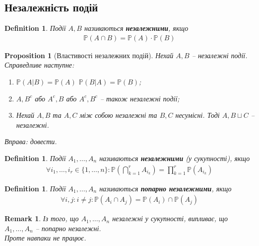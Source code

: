 \documentclass[a4paper, 10pt]{article}
\theoremstyle{theoremdd}
\newtheorem{definition}[theorem]{Definition}
\newtheorem{proposition}[theorem]{Proposition}
\newtheorem{remark}[theorem]{Remark}
\begin{document}
\subsection{Незалежність подій}
\begin{definition}
Події $A,B$ називаються \textbf{незалежними}, якщо
\begin{align*}
\mathbb{P}(A \cap B) = \mathbb{P}(A) \cdot \mathbb{P}(B)
\end{align*}
\end{definition}

\begin{proposition}[Властивості незалежних подій]
Нехай $A,B$ -- незалежні події. Справедливе наступне:
\begin{enumerate}[nosep,wide=0pt,label={\arabic*)}]
\item $\mathbb{P}(A|B) = \mathbb{P}(A)$ \qquad $\mathbb{P}(B|A) = \mathbb{P}(B)$;
\item $A,B^c$ або $A^c,B$ або $A^c,B^c$ -- також незалежні події;
\item Нехай $A,B$ та $A,C$ між собою незалежні та $B,C$ несумісні. Тоді $A, B \sqcup C$ -- незалежні.
\end{enumerate}
\textit{Вправа: довести.}
\end{proposition}

\begin{definition}
Події $A_1,\dots,A_n$ називаються \textbf{незалежними} (у сукупності), якщо
\begin{align*}
\forall i_1,\dots,i_r \in \{1,\dots,n\}: \mathbb{P}\left( \bigcap_{k=1}^r A_{i_k} \right) = \prod_{k=1}^r \mathbb{P}(A_{i_k})
\end{align*}
\end{definition}

\begin{definition}
Події $A_1,\dots,A_n$ називаються \textbf{попарно незалежними}, якщо
\begin{align*}
\forall i,j: i \neq j: \mathbb{P}(A_i \cap A_j) = \mathbb{P}(A_i) \cap \mathbb{P}(A_j)
\end{align*}
\end{definition}

\begin{remark}
Із того, що $A_1,\dots,A_n$ незалежні у сукупності, випливає, що $A_1,\dots,A_n$ -- попарно незалежні.\\
Проте навпаки не працює.
\end{remark}
\end{document}
